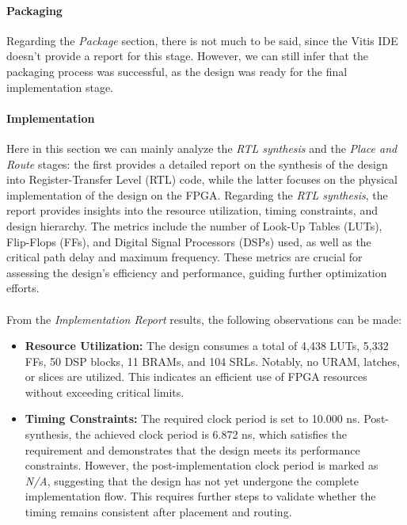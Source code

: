 \documentclass{article}
\begin{document}
\paragraph{Packaging}
Regarding the \textit{Package} section, there is  not much to be said, since the Vitis IDE doesn't provide a report for this stage. However, we can still infer that the packaging process was successful, as the design was ready for the final implementation stage.

\paragraph{Implementation}

Here in this section we can mainly analyze the \textit{RTL synthesis} and the \textit{Place and Route} stages: the first provides a detailed report on the synthesis of the design into Register-Transfer Level (RTL) code, while the latter focuses on the physical implementation of the design on the FPGA.
Regarding the \textit{RTL synthesis}, the report provides insights into the resource utilization, timing constraints, and design hierarchy. The metrics include the number of Look-Up Tables (LUTs), Flip-Flops (FFs), and Digital Signal Processors (DSPs) used, as well as the critical path delay and maximum frequency. These metrics are crucial for assessing the design's efficiency and performance, guiding further optimization efforts.
\\\\ From the \textit{Implementation Report} results, the following observations can be made:

\begin{itemize}
    \item \textbf{Resource Utilization:} The design consumes a total of 4,438 LUTs, 5,332 FFs, 50 DSP blocks, 11 BRAMs, and 104 SRLs. Notably, no URAM, latches, or slices are utilized. This indicates an efficient use of FPGA resources without exceeding critical limits.
    \item \textbf{Timing Constraints:} The required clock period is set to 10.000 ns. Post-synthesis, the achieved clock period is 6.872 ns, which satisfies the requirement and demonstrates that the design meets its performance constraints. However, the post-implementation clock period is marked as \textit{N/A}, suggesting that the design has not yet undergone the complete implementation flow. This requires further steps to validate whether the timing remains consistent after placement and routing.
\end{itemize}
\end{document}
